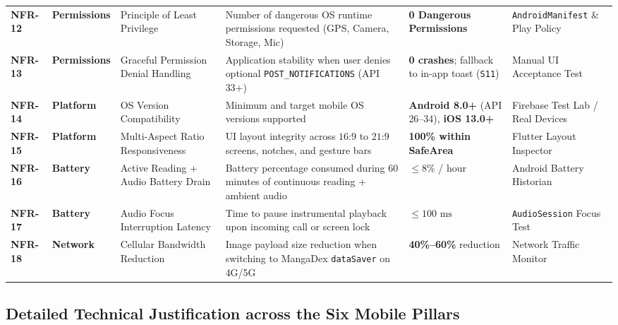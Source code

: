 \begin{scriptsize}
\begin{longtable}{C{1.2cm} L{2.0cm} L{2.8cm} L{3.5cm} C{2.1cm} L{2.25cm}}
\textbf{NFR-12} & \textbf{Permissions} & Principle of Least Privilege & Number of dangerous OS runtime permissions requested (GPS, Camera, Storage, Mic) & \textbf{0 Dangerous Permissions} & \texttt{AndroidManifest} \& Play Policy \\
\textbf{NFR-13} & \textbf{Permissions} & Graceful Permission Denial Handling & Application stability when user denies optional \texttt{POST\_NOTIFICATIONS} (API 33+) & \textbf{0 crashes}; fallback to in-app toast (\texttt{S11}) & Manual UI Acceptance Test \\
\textbf{NFR-14} & \textbf{Platform} & OS Version Compatibility & Minimum and target mobile OS versions supported & \textbf{Android 8.0+} (API 26--34), \textbf{iOS 13.0+} & Firebase Test Lab / Real Devices \\
\textbf{NFR-15} & \textbf{Platform} & Multi-Aspect Ratio Responsiveness & UI layout integrity across $16\text{:}9$ to $21\text{:}9$ screens, notches, and gesture bars & \textbf{100\% within SafeArea} & Flutter Layout Inspector \\
\textbf{NFR-16} & \textbf{Battery} & Active Reading + Audio Battery Drain & Battery percentage consumed during 60 minutes of continuous reading + ambient audio & $\le 8\%$ / hour & Android Battery Historian \\
\textbf{NFR-17} & \textbf{Battery} & Audio Focus Interruption Latency & Time to pause instrumental playback upon incoming call or screen lock & $\le 100\text{ ms}$ & \texttt{AudioSession} Focus Test \\
\textbf{NFR-18} & \textbf{Network} & Cellular Bandwidth Reduction & Image payload size reduction when switching to MangaDex \texttt{dataSaver} on 4G/5G & \textbf{40\%--60\%} reduction & Network Traffic Monitor \\
\end{longtable}
\end{scriptsize}

\subsection{Detailed Technical Justification across the Six Mobile Pillars}
\label{subsec:nfr_pillars}

